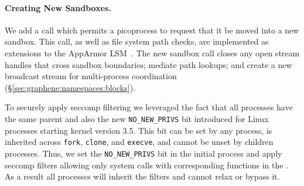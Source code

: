\paragraph{Creating New Sandboxes.~} We add a \pal{} call which
permits a picoprocess to request that it be moved into a new sandbox.
This call, as well as file system path checks, are implemented
as extensions to the  AppArmor LSM~\cite{apparmor}.
The new sandbox call closes any open stream handles that cross sandbox boundaries;
mediate path lookups;
and create a new broadcast stream for multi-process
 coordination (\S\ref{sec:graphene:namespaces:blocks}).

To securely apply seccomp filtering we leveraged the fact that all
\graphene{} processes have the same parent and also the new
{\tt NO\_NEW\_PRIVS} bit introduced for Linux processes starting kernel
version 3.5. This bit can be set by any process, is inherited across
{\tt fork}, {\tt clone}, and {\tt execve}, and cannot be unset by
children processes. Thus, we set the {\tt NO\_NEW\_PRIVS} bit in the initial
\graphene{} process and apply seccomp filters allowing only system calls
with corresponding functions in the \pal{}. As a result all \graphene{}
processes will inherit the filters and cannot relax or bypass it.





